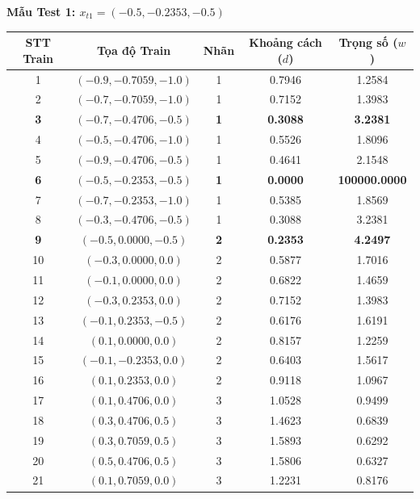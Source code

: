 \documentclass[12pt,a4paper]{article}
\begin{document}
\textbf{Mẫu Test 1: $x_{t1} = (-0.5, -0.2353, -0.5)$}
\begin{table}[H]
\centering
\footnotesize
\renewcommand{\arraystretch}{0.85}
\begin{tabular}{|c|c|c|c|c|}
\hline
\textbf{STT Train} & \textbf{Tọa độ Train} & \textbf{Nhãn} & \textbf{Khoảng cách ($d$)} & \textbf{Trọng số ($w$)} \\ \hline
1 & $(-0.9, -0.7059, -1.0)$ & 1 & 0.7946 & 1.2584 \\ \hline
2 & $(-0.7, -0.7059, -1.0)$ & 1 & 0.7152 & 1.3983 \\ \hline
\textbf{3} & $\mathbf{(-0.7, -0.4706, -0.5)}$ & \textbf{1} & \textbf{0.3088} & \textbf{3.2381} \\ \hline
4 & $(-0.5, -0.4706, -1.0)$ & 1 & 0.5526 & 1.8096 \\ \hline
5 & $(-0.9, -0.4706, -0.5)$ & 1 & 0.4641 & 2.1548 \\ \hline
\textbf{6} & $\mathbf{(-0.5, -0.2353, -0.5)}$ & \textbf{1} & \textbf{0.0000} & \textbf{100000.0000} \\ \hline
7 & $(-0.7, -0.2353, -1.0)$ & 1 & 0.5385 & 1.8569 \\ \hline
8 & $(-0.3, -0.4706, -0.5)$ & 1 & 0.3088 & 3.2381 \\ \hline
\textbf{9} & $\mathbf{(-0.5, 0.0000, -0.5)}$ & \textbf{2} & \textbf{0.2353} & \textbf{4.2497} \\ \hline
10 & $(-0.3, 0.0000, 0.0)$ & 2 & 0.5877 & 1.7016 \\ \hline
11 & $(-0.1, 0.0000, 0.0)$ & 2 & 0.6822 & 1.4659 \\ \hline
12 & $(-0.3, 0.2353, 0.0)$ & 2 & 0.7152 & 1.3983 \\ \hline
13 & $(-0.1, 0.2353, -0.5)$ & 2 & 0.6176 & 1.6191 \\ \hline
14 & $(0.1, 0.0000, 0.0)$ & 2 & 0.8157 & 1.2259 \\ \hline
15 & $(-0.1, -0.2353, 0.0)$ & 2 & 0.6403 & 1.5617 \\ \hline
16 & $(0.1, 0.2353, 0.0)$ & 2 & 0.9118 & 1.0967 \\ \hline
17 & $(0.1, 0.4706, 0.0)$ & 3 & 1.0528 & 0.9499 \\ \hline
18 & $(0.3, 0.4706, 0.5)$ & 3 & 1.4623 & 0.6839 \\ \hline
19 & $(0.3, 0.7059, 0.5)$ & 3 & 1.5893 & 0.6292 \\ \hline
20 & $(0.5, 0.4706, 0.5)$ & 3 & 1.5806 & 0.6327 \\ \hline
21 & $(0.1, 0.7059, 0.0)$ & 3 & 1.2231 & 0.8176 \\ \hline

\end{tabular}
\end{table}
\end{document}
